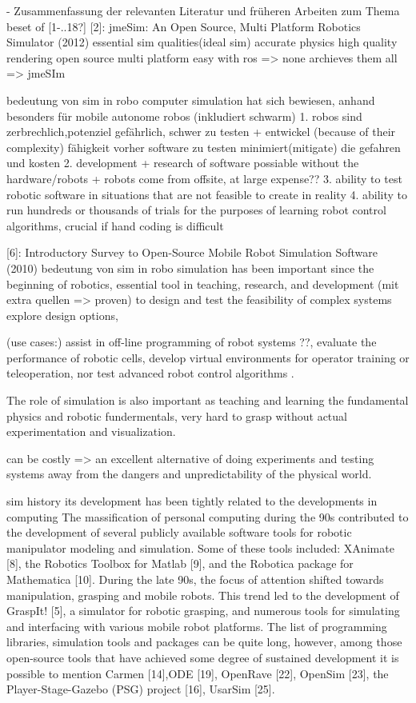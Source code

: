 \documentclass[german,version-2020-11]{uzl-thesis}
\begin{document}
- Zusammenfassung der relevanten Literatur und früheren Arbeiten zum Thema
beset of [1-..18?]
[2]: jmeSim: An Open Source, Multi Platform Robotics Simulator (2012)
essential sim qualities(ideal sim)
	accurate physics
	high quality rendering
	open source
	multi platform
	easy with ros
	=> none archieves them all => jmeSIm

bedeutung von sim in robo
	computer simulation hat sich bewiesen, anhand
		besonders für mobile autonome robos (inkludiert schwarm)
		1. robos sind zerbrechlich,potenziel gefährlich, schwer zu testen + entwickel (because of their complexity)
		fähigkeit vorher software zu testen minimiert(mitigate) die gefahren und kosten
		2. development + research of software possiable without the hardware/robots
			+ robots come from offsite, at large expense??
		3. ability to test robotic software in situations that are not feasible to create in reality
		4. ability to run hundreds or thousands of trials for the purposes of learning robot control algorithms, crucial if hand coding is difficult


[6]: Introductory Survey to Open-Source Mobile Robot Simulation Software (2010)
    bedeutung von sim in robo
      simulation has been important since the beginning of robotics,
      essential tool in teaching, research, and development  (mit extra quellen => proven)
      to design and test the feasibility of complex systems
      explore design options, 
      
      (use cases:)
      assist in off-line programming of robot systems ??,
       evaluate the performance of robotic cells,
      develop virtual environments for operator training or teleoperation, 
      nor test advanced robot control algorithms .
      
      The role of simulation is also important as teaching and learning the fundamental physics and robotic fundermentals, very hard to grasp without actual experimentation and visualization. 
      
      can be costly => an excellent alternative of doing experiments and testing systems away from the dangers and unpredictability of the physical world.
      
    sim history
      its development has been tightly related to the developments in computing
      The massification of personal computing during the 90s contributed to the development of several publicly available software tools for robotic manipulator modeling and simulation. Some of these tools included: XAnimate [8], the Robotics Toolbox for Matlab [9], and the Robotica package for Mathematica [10]. 
      During the late 90s, the focus of attention shifted towards manipulation, grasping and mobile robots. This trend led to the development of GraspIt! [5], a simulator for robotic grasping, and numerous tools for simulating and interfacing with various mobile robot platforms. The list of programming libraries, simulation tools and packages can be quite long, however, among those open-source tools that have achieved some degree of sustained development it is possible to mention Carmen [14],ODE [19], OpenRave [22], OpenSim [23], the Player-Stage-Gazebo (PSG) project [16], UsarSim [25]. 
      
\end{document}

